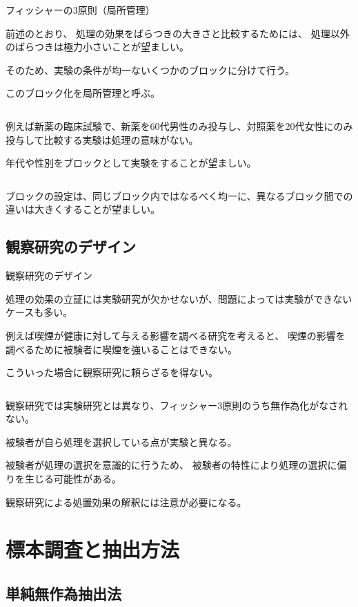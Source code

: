 \documentclass[dvipdfmx, autodetect-engine, aspectratio=169, 10.5pt]{beamer}
\begin{document}
\begin{frame}{フィッシャーの3原則（局所管理）}

	前述のとおり、
	処理の効果をばらつきの大きさと比較するためには、
	処理以外のばらつきは極力小さいことが望ましい。

	そのため、実験の条件が均一ないくつかのブロックに分けて行う。

	このブロック化を局所管理と呼ぶ。

	${}$

	例えば新薬の臨床試験で、新薬を60代男性のみ投与し、対照薬を20代女性にのみ投与して比較する実験は処理の意味がない。

	年代や性別をブロックとして実験をすることが望ましい。

	${}$

	ブロックの設定は、同じブロック内ではなるべく均一に、異なるブロック間での違いは大きくすることが望ましい。


\end{frame}

\subsection{観察研究のデザイン}

\begin{frame}{観察研究のデザイン}

	処理の効果の立証には実験研究が欠かせないが、問題によっては実験ができないケースも多い。

	例えば喫煙が健康に対して与える影響を調べる研究を考えると、
	喫煙の影響を調べるために被験者に喫煙を強いることはできない。

	こういった場合に観察研究に頼らざるを得ない。

	${}$

	観察研究では実験研究とは異なり、フィッシャー3原則のうち無作為化がなされない。

	被験者が自ら処理を選択している点が実験と異なる。

	被験者が処理の選択を意識的に行うため、
	被験者の特性により処理の選択に偏りを生じる可能性がある。

	観察研究による処置効果の解釈には注意が必要になる。


\end{frame}

\section{標本調査と抽出方法}

\subsection{単純無作為抽出法}
\end{document}
